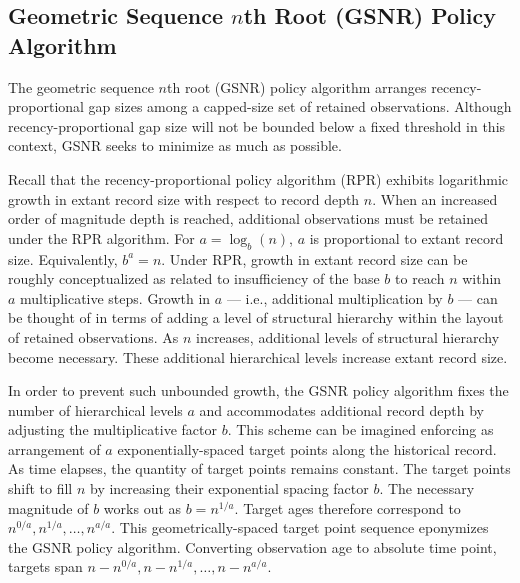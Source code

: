 \subsection{Geometric Sequence $n$th Root (GSNR) Policy Algorithm}
\label{sec:geom-seq-nth-root-algo}

The geometric sequence $n$th root (GSNR) policy algorithm arranges recency-proportional gap sizes among a capped-size set of retained observations.
Although recency-proportional gap size will not be bounded below a fixed threshold in this context, GSNR seeks to minimize as much as possible.

Recall that the recency-proportional policy algorithm (RPR) exhibits logarithmic growth in extant record size with respect to record depth $n$.
When an increased order of magnitude depth is reached, additional observations must be retained under the RPR algorithm.
For $a = \log_b(n)$, $a$ is proportional to extant record size.
Equivalently, $b^a = n$.
Under RPR, growth in extant record size can be roughly conceptualized as related to insufficiency of the base $b$ to reach $n$ within $a$ multiplicative steps.
Growth in $a$ --- i.e., additional multiplication by $b$ --- can be thought of in terms of adding a level of structural hierarchy within the layout of retained observations.
As $n$ increases, additional levels of structural hierarchy become necessary.
These additional hierarchical levels increase extant record size.

In order to prevent such unbounded growth, the GSNR policy algorithm fixes the number of hierarchical levels $a$ and accommodates additional record depth by adjusting the multiplicative factor $b$.
This scheme can be imagined enforcing as arrangement of $a$ exponentially-spaced target points along the historical record.
As time elapses, the quantity of target points remains constant.
The target points shift to fill $n$ by increasing their exponential spacing factor $b$.
The necessary magnitude of $b$ works out as $b = n^{1/a}$.
Target ages therefore correspond to $n^{0/a}, n^{1/a}, \ldots, n^{a/a}$.
This geometrically-spaced target point sequence eponymizes the GSNR policy algorithm.
Converting observation age to absolute time point, targets span $n - n^{0/a}, n - n^{1/a}, \ldots, n - n^{a/a}$.

